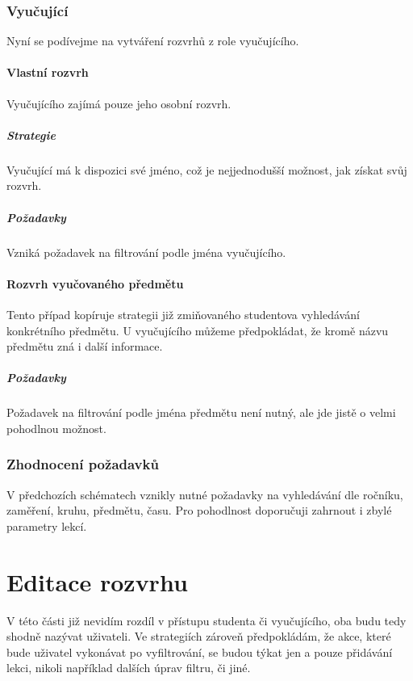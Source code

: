\documentclass[a4paper, 11pt]{article}
\begin{document}
\section{Vyučující}
Nyní se podívejme na vytváření rozvrhů z role vyučujícího.

\subsection{Vlastní rozvrh}
Vyučujícího zajímá pouze jeho osobní rozvrh.

\subsubsection{Strategie}
Vyučující má k dispozici své jméno, což je nejjednodušší možnost, jak získat svůj rozvrh.

\subsubsection{Požadavky}
Vzniká požadavek na filtrování podle jména vyučujícího.

\subsection{Rozvrh vyučovaného předmětu}
Tento případ kopíruje strategii již zmiňovaného studentova vyhledávání konkrétního předmětu. U vyučujícího můžeme předpokládat, že kromě názvu předmětu zná i další informace.

\subsubsection{Požadavky}
Požadavek na filtrování podle jména předmětu není nutný, ale jde jistě o velmi pohodlnou možnost.

\section{Zhodnocení požadavků}
V předchozích schématech vznikly nutné požadavky na vyhledávání dle ročníku, zaměření, kruhu, předmětu, času. Pro pohodlnost doporučuji zahrnout i zbylé parametry lekcí. 

\part{Editace rozvrhu}
V této části již nevidím rozdíl v přístupu studenta či vyučujícího, 
oba budu tedy shodně nazývat uživateli. Ve strategiích zároveň předpokládám, že akce, které bude uživatel vykonávat po vyfiltrování, se budou týkat jen a pouze přidávání lekci, nikoli například dalších úprav filtru, či jiné.
\end{document}
